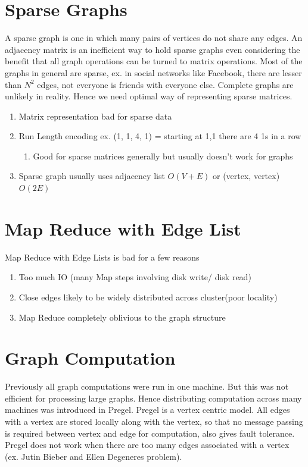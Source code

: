 \documentclass[twoside]{article}
\begin{document}
\section{Sparse Graphs}
A sparse graph is one in which many pairs of vertices do not share any edges. An adjacency matrix is an inefficient way to hold sparse graphs even considering the benefit that all graph operations can be turned to matrix operations. Most of the graphs in general are sparse, ex. in social networks like Facebook, there are lesser than $N^2$ edges, not everyone is friends with everyone else. Complete graphs are unlikely in reality. Hence we need optimal way of representing sparse matrices.
\begin{enumerate}
\item Matrix representation bad for sparse data
\item Run Length encoding ex. (1, 1, 4, 1) = starting at 1,1 there are 4 1s in a row
\begin{enumerate}
\item Good for sparse matrices generally but usually doesn't work for graphs
\end{enumerate}
\item Sparse graph usually uses adjacency list $O(V + E)$ or (vertex, vertex) $O(2E)$
\end{enumerate}

\section{Map Reduce with Edge List}
Map Reduce with Edge Lists is bad for a few reasons
\begin{enumerate}
\item Too much IO (many Map steps involving disk write/ disk read)
\item Close edges likely to be widely distributed across cluster(poor locality)
\item Map Reduce completely oblivious to the graph structure
\end{enumerate}

\section{Graph Computation}
Previously all graph computations were run in one machine. But this was not efficient for processing large graphs. Hence distributing computation across many machines was introduced in Pregel. Pregel is a vertex centric model. All edges with a vertex are stored locally along with the vertex, so that no message passing is required between vertex and edge for computation, also gives fault tolerance. Pregel does not work when there are too many edges associated with a vertex (ex. Jutin Bieber and Ellen Degeneres problem).
\end{document}

